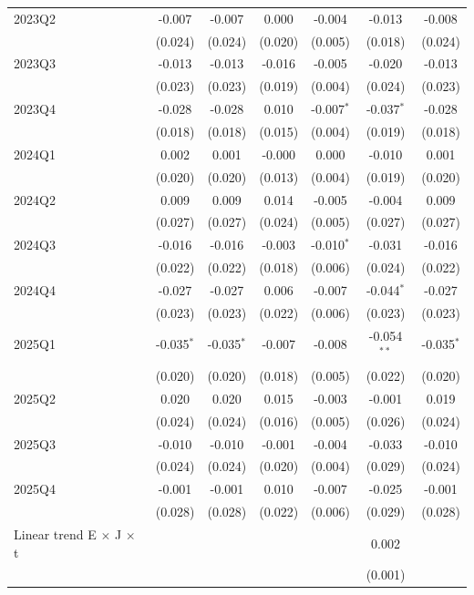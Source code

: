 \begin{table}[htbp]
\begin{tabular}{lcccccc}
2023Q2 & -0.007 & -0.007 & 0.000 & -0.004 & -0.013 & -0.008 \\
 & (0.024) & (0.024) & (0.020) & (0.005) & (0.018) & (0.024) \\
2023Q3 & -0.013 & -0.013 & -0.016 & -0.005 & -0.020 & -0.013 \\
 & (0.023) & (0.023) & (0.019) & (0.004) & (0.024) & (0.023) \\
2023Q4 & -0.028 & -0.028 & 0.010 & -0.007$^{*}$ & -0.037$^{*}$ & -0.028 \\
 & (0.018) & (0.018) & (0.015) & (0.004) & (0.019) & (0.018) \\
2024Q1 & 0.002 & 0.001 & -0.000 & 0.000 & -0.010 & 0.001 \\
 & (0.020) & (0.020) & (0.013) & (0.004) & (0.019) & (0.020) \\
2024Q2 & 0.009 & 0.009 & 0.014 & -0.005 & -0.004 & 0.009 \\
 & (0.027) & (0.027) & (0.024) & (0.005) & (0.027) & (0.027) \\
2024Q3 & -0.016 & -0.016 & -0.003 & -0.010$^{*}$ & -0.031 & -0.016 \\
 & (0.022) & (0.022) & (0.018) & (0.006) & (0.024) & (0.022) \\
2024Q4 & -0.027 & -0.027 & 0.006 & -0.007 & -0.044$^{*}$ & -0.027 \\
 & (0.023) & (0.023) & (0.022) & (0.006) & (0.023) & (0.023) \\
2025Q1 & -0.035$^{*}$ & -0.035$^{*}$ & -0.007 & -0.008 & -0.054$^{**}$ & -0.035$^{*}$ \\
 & (0.020) & (0.020) & (0.018) & (0.005) & (0.022) & (0.020) \\
2025Q2 & 0.020 & 0.020 & 0.015 & -0.003 & -0.001 & 0.019 \\
 & (0.024) & (0.024) & (0.016) & (0.005) & (0.026) & (0.024) \\
2025Q3 & -0.010 & -0.010 & -0.001 & -0.004 & -0.033 & -0.010 \\
 & (0.024) & (0.024) & (0.020) & (0.004) & (0.029) & (0.024) \\
2025Q4 & -0.001 & -0.001 & 0.010 & -0.007 & -0.025 & -0.001 \\
 & (0.028) & (0.028) & (0.022) & (0.006) & (0.029) & (0.028) \\
Linear trend E $\times$ J $\times$ t &  &  &  &  & 0.002 &  \\
 &  &  &  &  & (0.001) &  \\
\bottomrule
\end{tabular}
\par\vspace{2pt}{\footnotesize Reference quarter 2022Q3 omitted. Standard errors clustered on occupation in parentheses. * p<0.10, ** p<0.05, *** p<0.01. Model 2 replaces the pre-period dummies with the linear trend; its post coefficients are deviations from the extrapolated trend.}
\end{table}
